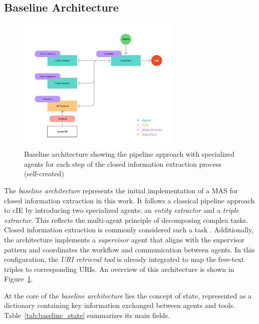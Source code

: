 \documentclass[a4paper,oneside,bibliography=totoc]{scrbook}
\begin{document}
\subsection{Baseline Architecture}
\label{subsec:baseline}

\begin{figure}[tp]
  \centering
  \includegraphics[width=0.7\textwidth]{figures/Baseline Architecture.png}
  \caption[Baseline architecture showing the pipeline approach with specialized agents for each step of the closed information extraction process]{Baseline architecture showing the pipeline approach with specialized agents for each step of the closed information extraction process (self-created)}
  \label{fig:baseline_architecture}
\end{figure}

The \textit{baseline architecture} represents the initial implementation of a \ac{MAS} for closed information extraction in this work. It follows a classical pipeline approach to \ac{cIE} by introducing two specialized agents: an \textit{entity extractor} and a \textit{triple extractor}. This reflects the multi-agent principle of decomposing complex tasks. Closed information extraction is commonly considered such a task \cite{Josifoski2021}. Additionally, the architecture implements a \textit{supervisor} agent that aligns with the supervisor pattern and coordinates the workflow and communication between agents. In this configuration, the \textit{\ac{URI} retrieval tool} is already integrated to map the free-text triples to corresponding \acp{URI}. An overview of this architecture is shown in Figure~\ref{fig:baseline_architecture}.

At the core of the \textit{baseline architecture} lies the concept of state, represented as a dictionary containing key information exchanged between agents and tools. Table~\ref{tab:baseline_state} summarizes its main fields.
\end{document}
